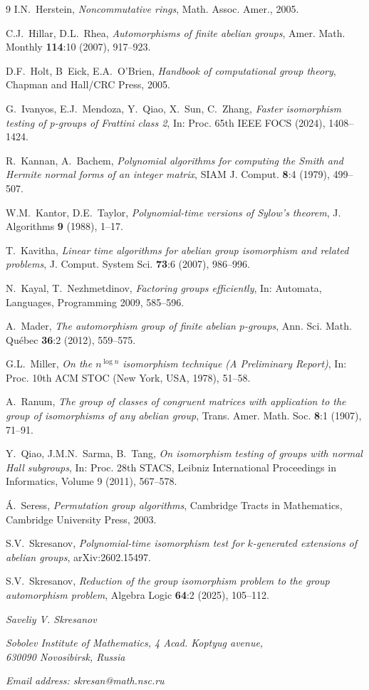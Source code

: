 \documentclass{article}
\begin{document}
\begin{thebibliography}{9}
	I.N.~Herstein, \emph{Noncommutative rings}, Math. Assoc. Amer., 2005.

	C.J.~Hillar, D.L.~Rhea,
	\emph{Automorphisms of finite abelian groups},
	Amer. Math. Monthly \textbf{114}:10 (2007), 917--923.

	D.F.~Holt, B~Eick, E.A.~O'Brien,
	\emph{Handbook of computational group theory},
	Chapman and Hall/CRC Press, 2005.

	G.~Ivanyos, E.J.~Mendoza, Y.~Qiao, X.~Sun, C.~Zhang,
	\emph{Faster isomorphism testing of p-groups of Frattini class 2},
	In: Proc. 65th IEEE FOCS (2024), 1408--1424.

	R.~Kannan, A.~Bachem, \emph{Polynomial algorithms for computing the Smith and Hermite normal forms of an integer matrix},
	SIAM J. Comput. \textbf{8}:4 (1979), 499--507.
	
	W.M.~Kantor, D.E.~Taylor,
	\emph{Polynomial-time versions of Sylow's theorem},
	J. Algorithms \textbf{9} (1988), 1--17.

	T.~Kavitha,
	\emph{Linear time algorithms for abelian group isomorphism and related problems},
	J. Comput. System Sci. \textbf{73}:6 (2007), 986--996.

	N.~Kayal, T.~Nezhmetdinov,
	\emph{Factoring groups efficiently},
	In: Automata, Languages, Programming 2009, 585--596.

	A.~Mader,
	\emph{The automorphism group of finite abelian $p$-groups},
	Ann. Sci. Math. Qu\'ebec \textbf{36}:2 (2012), 559--575.

	G.L.~Miller,
	\emph{On the $ n^{\log n}$ isomorphism technique (A Preliminary Report)},
	In: Proc. 10th ACM STOC (New York, USA, 1978), 51--58.

	A.~Ranum,
	\emph{The group of classes of congruent matrices with application to the group of isomorphisms of any abelian group},
	Trans. Amer. Math. Soc. \textbf{8}:1 (1907), 71--91.

	Y.~Qiao, J.M.N.~Sarma, B.~Tang,
	\emph{On isomorphism testing of groups with normal Hall subgroups},
	In: Proc. 28th STACS, Leibniz International Proceedings in Informatics, Volume 9 (2011), 567--578.

	\'A.~Seress, \emph{Permutation group algorithms}, Cambridge Tracts in Mathematics, Cambridge University Press, 2003.

	S.V.~Skresanov,
	\emph{Polynomial-time isomorphism test for $k$-generated extensions of abelian groups}, arXiv:2602.15497. %

	S.V.~Skresanov,
	\emph{Reduction of the group isomorphism problem to the group automorphism problem},
	Algebra Logic \textbf{64}:2 (2025), 105--112.

\end{thebibliography}
\bigskip

\noindent
\emph{Saveliy V. Skresanov}

\noindent
\emph{Sobolev Institute of Mathematics, 4 Acad. Koptyug avenue,\\ 630090 Novosibirsk, Russia}

\noindent
\emph{Email address: skresan@math.nsc.ru}
\end{document}
